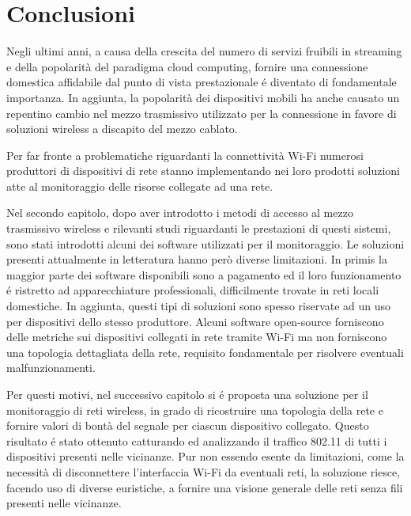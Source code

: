 \chapter{Conclusioni}
Negli ultimi anni, a causa della crescita del numero di servizi fruibili in streaming e della popolarit\`a del paradigma cloud computing, fornire una connessione domestica affidabile dal punto di vista prestazionale \'e diventato di fondamentale importanza.
In aggiunta, la popolarit\`a dei dispositivi mobili ha anche causato un repentino cambio nel mezzo trasmissivo utilizzato per la connessione in favore di soluzioni wireless a discapito del mezzo cablato.

Per far fronte a problematiche riguardanti la connettivit\`a Wi-Fi numerosi produttori di dispositivi di rete stanno implementando nei loro prodotti soluzioni atte al monitoraggio delle risorse collegate ad una rete.

Nel secondo capitolo, dopo aver introdotto i metodi di accesso al mezzo trasmissivo wireless e rilevanti studi riguardanti le prestazioni di questi sistemi, sono stati introdotti alcuni dei software utilizzati per il monitoraggio.
Le soluzioni presenti attualmente in letteratura hanno per\`o diverse limitazioni.
In primis la maggior parte dei software disponibili sono a pagamento ed il loro funzionamento \'e ristretto ad apparecchiature professionali, difficilmente trovate in reti locali domestiche.
In aggiunta, questi tipi di soluzioni sono spesso riservate ad un uso per dispositivi dello stesso produttore.
Alcuni software open-source forniscono delle metriche sui dispositivi collegati in rete tramite Wi-Fi ma non forniscono una topologia dettagliata della rete, requisito fondamentale per risolvere eventuali malfunzionamenti.

Per questi motivi, nel successivo capitolo si \'e proposta una soluzione per il monitoraggio di reti wireless, in grado di ricostruire una topologia della rete e fornire valori di bont\`a del segnale per ciascun dispositivo collegato.
Questo risultato \'e stato ottenuto catturando ed analizzando il traffico 802.11 di tutti i dispositivi presenti nelle vicinanze.
Pur non essendo esente da limitazioni, come la necessit\`a di disconnettere l'interfaccia Wi-Fi da eventuali reti, la soluzione riesce, facendo uso di diverse euristiche, a fornire una visione generale delle reti senza fili presenti nelle vicinanze.

